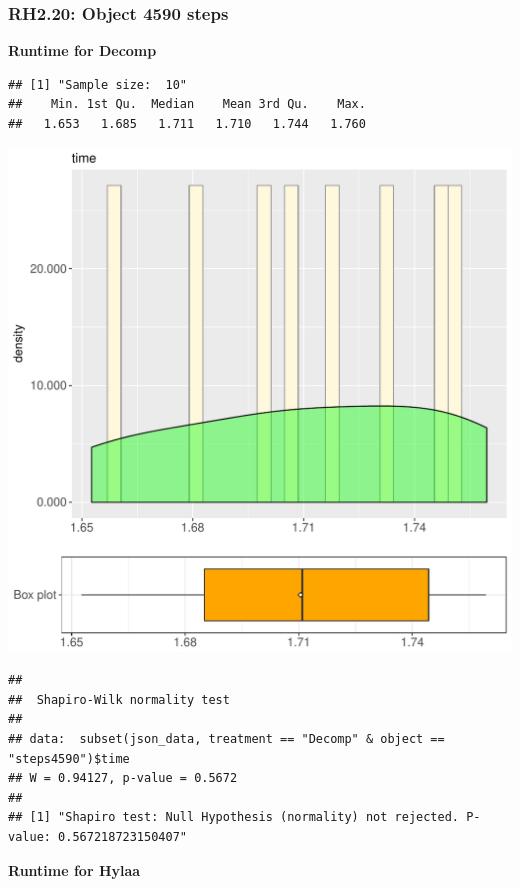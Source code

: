 \documentclass{article}\usepackage[]{graphicx}\usepackage[]{color}
\makeatletter
\def\maxwidth{ %
  \ifdim\Gin@nat@width>\linewidth
    \linewidth
  \else
    \Gin@nat@width
  \fi
}
\newenvironment{kframe}{%
 \def\at@end@of@kframe{}%
 \ifinner\ifhmode%
  \def\at@end@of@kframe{\end{minipage}}%
  \begin{minipage}{\columnwidth}%
 \fi\fi%
 \def\FrameCommand##1{\hskip\@totalleftmargin \hskip-\fboxsep
 \colorbox{shadecolor}{##1}\hskip-\fboxsep
     \hskip-\linewidth \hskip-\@totalleftmargin \hskip\columnwidth}%
 \MakeFramed {\advance\hsize-\width
   \@totalleftmargin\z@ \linewidth\hsize
   \@setminipage}}%
 {\par\unskip\endMakeFramed%
 \at@end@of@kframe}
\newenvironment{knitrout}{}{} %
\makeatother
\begin{document}
\subsubsection{RH2.20: Object 4590 steps}

 \textbf{Runtime for Decomp}
\begin{knitrout}
\color{fgcolor}\begin{kframe}
\begin{verbatim}
## [1] "Sample size:  10"
##    Min. 1st Qu.  Median    Mean 3rd Qu.    Max. 
##   1.653   1.685   1.711   1.710   1.744   1.760
\end{verbatim}
\end{kframe}
\includegraphics[width=\maxwidth]{figure/RH2_Decomp_steps4590-1} 
\begin{kframe}\begin{verbatim}
## 
## 	Shapiro-Wilk normality test
## 
## data:  subset(json_data, treatment == "Decomp" & object == "steps4590")$time
## W = 0.94127, p-value = 0.5672
## 
## [1] "Shapiro test: Null Hypothesis (normality) not rejected. P-value: 0.567218723150407"
\end{verbatim}
\end{kframe}
\end{knitrout}
 \textbf{Runtime for Hylaa}
\end{document}
